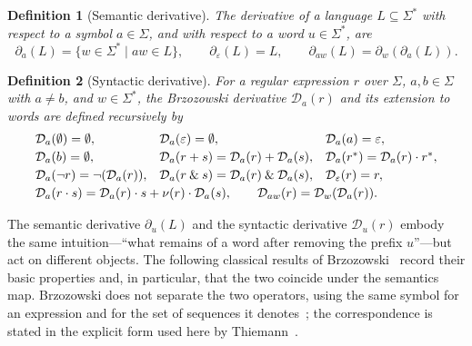 \documentclass{article}
\newtheorem{definition}{Definition}[section]
\begin{document}
\begin{definition}[Semantic derivative]\label{def:derivative}\label{def:derivative-string}
The derivative of a language $L \subseteq \Sigma^*$ with respect to a symbol
$a\in\Sigma$, and with respect to a word $u\in\Sigma^*$, are
\[
  \partial_a(L)=\{ w \in \Sigma^* \mid a w \in L \},
  \qquad
  \partial_\varepsilon(L)=L,
  \qquad
  \partial_{aw}(L)=\partial_w(\partial_a(L)).
\]
\end{definition}

\begin{definition}[Syntactic derivative]\label{def:regex-symbol-derivative}\label{def:regex-derivative}
For a regular expression $r$ over $\Sigma$, $a,b\in\Sigma$ with $a\neq b$, and
$w\in\Sigma^*$, the Brzozowski derivative $\mathcal D_a(r)$ and its extension to words
are defined recursively by
\[
\begin{array}{l@{\quad}l@{\quad}l}
    \mathcal{D}_a(\emptyset) = \emptyset, &
    \mathcal{D}_a(\varepsilon) = \emptyset, &
    \mathcal{D}_a(a) = \varepsilon,\\[0.5ex]
    \mathcal{D}_a(b) = \emptyset, &
    \mathcal{D}_a(r+s) = \mathcal{D}_a(r)+\mathcal{D}_a(s), &
    \mathcal{D}_a(r^*) = \mathcal{D}_a(r)\cdot r^*,\\[0.5ex]
    \mathcal{D}_a(\neg r) = \neg(\mathcal{D}_a(r)), &
    \mathcal{D}_a(r\:\&\:s) = \mathcal{D}_a(r)\:\&\:\mathcal{D}_a(s), &
    \mathcal{D}_\varepsilon(r)=r,\\[0.5ex]
    \multicolumn{3}{l}{\mathcal{D}_a(r\cdot s) = \mathcal{D}_a(r)\cdot s + \nu(r)\cdot \mathcal{D}_a(s),
    \qquad \mathcal{D}_{aw}(r)=\mathcal{D}_w(\mathcal{D}_a(r)).}
\end{array}
\]
\end{definition}

The semantic derivative $\partial_u(L)$ and the syntactic derivative $\mathcal D_u(r)$
embody the same intuition---``what remains of a word after removing the prefix
$u$''---but act on different objects. The following classical results of
Brzozowski~\cite{B64} record their basic properties and, in particular, that the two
coincide under the semantics map. Brzozowski does not separate the two operators, using
the same symbol for an expression and for the set of sequences it
denotes~\cite{B64}; the correspondence is stated in the explicit form used here
by Thiemann~\cite{Thiemann2016}.
\end{document}
